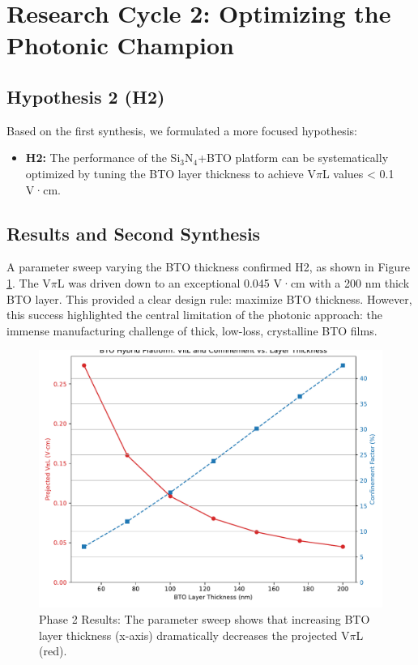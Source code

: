 \documentclass{article}
\begin{document}
\section{Research Cycle 2: Optimizing the Photonic Champion}
\subsection{Hypothesis 2 (H2)}
Based on the first synthesis, we formulated a more focused hypothesis:
\begin{itemize}
    \item \textbf{H2:} The performance of the Si$_3$N$_4$+BTO platform can be systematically optimized by tuning the BTO layer thickness to achieve V$\pi$L values < 0.1 V·cm.
\end{itemize}

\subsection{Results and Second Synthesis}
A parameter sweep varying the BTO thickness confirmed H2, as shown in Figure \ref{fig:sweep}. The V$\pi$L was driven down to an exceptional 0.045 V·cm with a 200 nm thick BTO layer. This provided a clear design rule: maximize BTO thickness. However, this success highlighted the central limitation of the photonic approach: the immense manufacturing challenge of thick, low-loss, crystalline BTO films.

\begin{figure}[H]
    \centering
    \includegraphics[width=0.9\linewidth]{simulation_v2_optimization_sweep.pdf}
    \caption{Phase 2 Results: The parameter sweep shows that increasing BTO layer thickness (x-axis) dramatically decreases the projected V$\pi$L (red).}
    \label{fig:sweep}
\end{figure}
\end{document}
